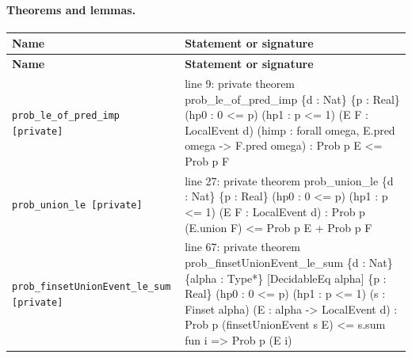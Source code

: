 \documentclass[10pt]{article}
\begin{document}
\paragraph{Theorems and lemmas.}
\begin{longtable}{>{\raggedright\arraybackslash}p{} >{\raggedright\arraybackslash}p{}}
\textbf{Name} & \textbf{Statement or signature} \\
\hline
\endfirsthead
\textbf{Name} & \textbf{Statement or signature} \\
\hline
\endhead
\texttt{prob\_\allowbreak{}le\_\allowbreak{}of\_\allowbreak{}pred\_\allowbreak{}imp [private]} & {\ttfamily\scriptsize line 9:\allowbreak{} private theorem prob\_\allowbreak{}le\_\allowbreak{}of\_\allowbreak{}pred\_\allowbreak{}imp \{d :\allowbreak{} Nat\} \{p :\allowbreak{} Real\} (\allowbreak{}hp0 :\allowbreak{} 0 <=\allowbreak{} p)\allowbreak{} (\allowbreak{}hp1 :\allowbreak{} p <=\allowbreak{} 1)\allowbreak{} (\allowbreak{}E F :\allowbreak{} LocalEvent d)\allowbreak{} (\allowbreak{}himp :\allowbreak{} forall omega,\allowbreak{} E.\allowbreak{}pred omega -\allowbreak{}> F.\allowbreak{}pred omega)\allowbreak{} :\allowbreak{} Prob p E <=\allowbreak{} Prob p F} \\[0.45em]
\texttt{prob\_\allowbreak{}union\_\allowbreak{}le [private]} & {\ttfamily\scriptsize line 27:\allowbreak{} private theorem prob\_\allowbreak{}union\_\allowbreak{}le \{d :\allowbreak{} Nat\} \{p :\allowbreak{} Real\} (\allowbreak{}hp0 :\allowbreak{} 0 <=\allowbreak{} p)\allowbreak{} (\allowbreak{}hp1 :\allowbreak{} p <=\allowbreak{} 1)\allowbreak{} (\allowbreak{}E F :\allowbreak{} LocalEvent d)\allowbreak{} :\allowbreak{} Prob p (\allowbreak{}E.\allowbreak{}union F)\allowbreak{} <=\allowbreak{} Prob p E +\allowbreak{} Prob p F} \\[0.45em]
\texttt{prob\_\allowbreak{}finsetUnionEvent\_\allowbreak{}le\_\allowbreak{}sum [private]} & {\ttfamily\scriptsize line 67:\allowbreak{} private theorem prob\_\allowbreak{}finsetUnionEvent\_\allowbreak{}le\_\allowbreak{}sum \{d :\allowbreak{} Nat\} \{alpha :\allowbreak{} Type*\allowbreak{}\} [DecidableEq alpha] \{p :\allowbreak{} Real\} (\allowbreak{}hp0 :\allowbreak{} 0 <=\allowbreak{} p)\allowbreak{} (\allowbreak{}hp1 :\allowbreak{} p <=\allowbreak{} 1)\allowbreak{} (\allowbreak{}s :\allowbreak{} Finset alpha)\allowbreak{} (\allowbreak{}E :\allowbreak{} alpha -\allowbreak{}> LocalEvent d)\allowbreak{} :\allowbreak{} Prob p (\allowbreak{}finsetUnionEvent s E)\allowbreak{} <=\allowbreak{} s.\allowbreak{}sum fun i =\allowbreak{}> Prob p (\allowbreak{}E i)\allowbreak{}} \\[0.45em]

\end{longtable}
\end{document}
